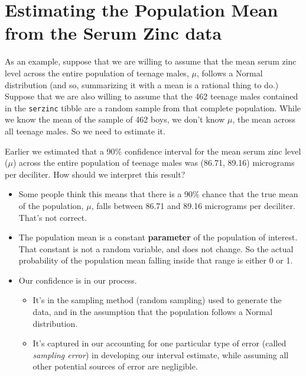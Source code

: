 \documentclass[
]{book}
\providecommand{\tightlist}{%
  \setlength{\itemsep}{0pt}\setlength{\parskip}{0pt}}
\begin{document}
\hypertarget{estimating-the-population-mean-from-the-serum-zinc-data}{%
\section{Estimating the Population Mean from the Serum Zinc data}\label{estimating-the-population-mean-from-the-serum-zinc-data}}

As an example, suppose that we are willing to assume that the mean serum zinc level across the entire population of teenage males, \(\mu\), follows a Normal distribution (and so, summarizing it with a mean is a rational thing to do.) Suppose that we are also willing to assume that the 462 teenage males contained in the \texttt{serzinc} tibble are a random sample from that complete population. While we know the mean of the sample of 462 boys, we don't know \(\mu\), the mean across all teenage males. So we need to estimate it.

Earlier we estimated that a 90\% confidence interval for the mean serum zinc level (\(\mu\)) across the entire population of teenage males was (86.71, 89.16) micrograms per deciliter. How should we interpret this result?

\begin{itemize}
\tightlist
\item
  Some people think this means that there is a 90\% chance that the true mean of the population, \(\mu\), falls between 86.71 and 89.16 micrograms per deciliter. That's not correct.
\item
  The population mean is a constant \textbf{parameter} of the population of interest. That constant is not a random variable, and does not change. So the actual probability of the population mean falling inside that range is either 0 or 1.
\item
  Our confidence is in our process.

  \begin{itemize}
  \tightlist
  \item
    It's in the sampling method (random sampling) used to generate the data, and in the assumption that the population follows a Normal distribution.
  \item
    It's captured in our accounting for one particular type of error (called \emph{sampling error}) in developing our interval estimate, while assuming all other potential sources of error are negligible.
  \end{itemize}
\end{itemize}
\end{document}
